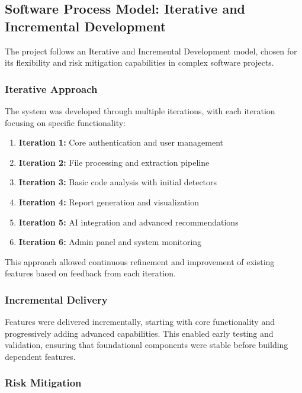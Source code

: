 \documentclass[12pt,a4paper]{article}
\begin{document}
    \subsection{Software Process Model: Iterative and Incremental Development}

    The project follows an Iterative and Incremental Development model, chosen for its flexibility and risk mitigation capabilities in complex software projects.

    \subsubsection{Iterative Approach}

    The system was developed through multiple iterations, with each iteration focusing on specific functionality:

    \begin{enumerate}[leftmargin=0.7in]
        \item \textbf{Iteration 1:} Core authentication and user management
        \item \textbf{Iteration 2:} File processing and extraction pipeline
        \item \textbf{Iteration 3:} Basic code analysis with initial detectors
        \item \textbf{Iteration 4:} Report generation and visualization
        \item \textbf{Iteration 5:} AI integration and advanced recommendations
        \item \textbf{Iteration 6:} Admin panel and system monitoring
    \end{enumerate}

    This approach allowed continuous refinement and improvement of existing features based on feedback from each iteration.

    \subsubsection{Incremental Delivery}

    Features were delivered incrementally, starting with core functionality and progressively adding advanced capabilities. This enabled early testing and validation, ensuring that foundational components were stable before building dependent features.

    \subsubsection{Risk Mitigation}
\end{document}
